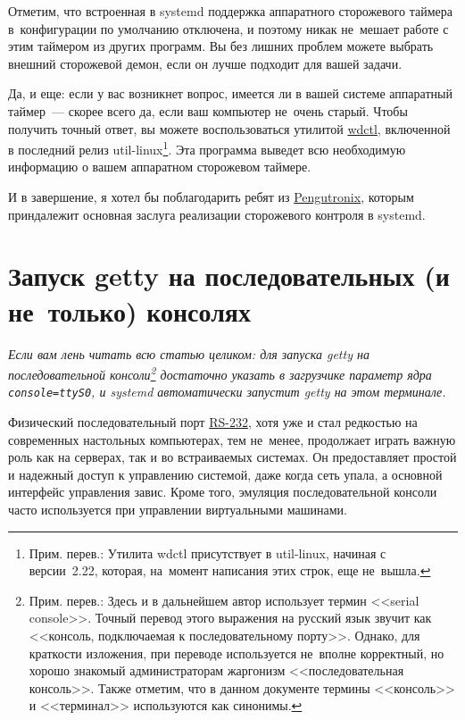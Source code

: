 \documentclass[10pt,oneside,a4paper]{article}
\begin{document}
Отметим, что встроенная в systemd поддержка аппаратного сторожевого таймера
в~конфигурации по умолчанию отключена, и поэтому никак не~мешает работе с этим
таймером из других программ. Вы без лишних проблем можете выбрать внешний
сторожевой демон, если он лучше подходит для вашей задачи.

Да, и еще: если у вас возникнет вопрос, имеется ли в вашей системе аппаратный
таймер~--- скорее всего да, если ваш компьютер не~очень старый. Чтобы получить
точный ответ, вы можете воспользоваться утилитой
\href{http://karelzak.blogspot.de/2012/05/eject1-sulogin1-wdctl1.html}{wdctl},
включенной в последний релиз util-linux\footnote{Прим. перев.: Утилита wdctl
присутствует в util-linux, начиная с версии~2.22, которая, на~момент написания
этих строк, еще не~вышла.}. Эта программа выведет всю необходимую
информацию о вашем аппаратном сторожевом таймере.

И в завершение, я хотел бы поблагодарить ребят из
\href{http://www.pengutronix.de/}{Pengutronix}, которым приндалежит основная
заслуга реализации сторожевого контроля в systemd.

\section{Запуск getty на последовательных (и не~только) консолях}

\emph{Если вам лень читать всю статью целиком: для запуска getty на
последовательной консоли\footnote{Прим. перев.: Здесь и в дальнейшем автор
использует термин <<serial console>>. Точный перевод этого выражения на русский
язык звучит как <<консоль, подключаемая к последовательному порту>>.  Однако,
для краткости изложения, при переводе используется не~вполне корректный, но
хорошо знакомый администраторам жаргонизм <<последовательная консоль>>. Также
отметим, что в данном документе термины <<консоль>> и <<терминал>> используются
как синонимы.} достаточно указать в загрузчике параметр ядра
\verb+console=ttyS0+, и systemd автоматически запустит getty на этом терминале.}

Физический последовательный порт 
\href{https://ru.wikipedia.org/wiki/RS-232}{RS-232}, хотя уже и стал редкостью
на современных настольных компьютерах, тем не~менее, продолжает играть важную
роль как на серверах, так и во встраиваемых системах. Он предоставляет простой и
надежный доступ к управлению системой, даже когда сеть упала, а основной
интерфейс управления завис. Кроме того, эмуляция последовательной консоли часто
используется при управлении виртуальными машинами.
\end{document}
